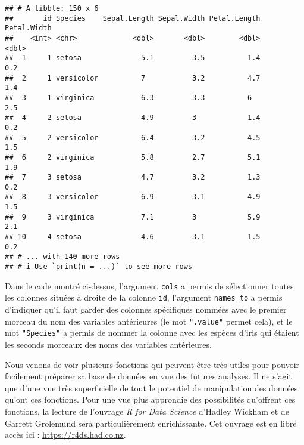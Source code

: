 \documentclass[
  french,
]{book}
\newenvironment{Shaded}{\begin{snugshade}}{\end{snugshade}}
\newcommand{\DataTypeTok}[1]{\textcolor[rgb]{0.13,0.29,0.53}{#1}}
\newcommand{\KeywordTok}[1]{\textcolor[rgb]{0.13,0.29,0.53}{\textbf{#1}}}
\newcommand{\NormalTok}[1]{#1}
\newcommand{\OperatorTok}[1]{\textcolor[rgb]{0.81,0.36,0.00}{\textbf{#1}}}
\newcommand{\StringTok}[1]{\textcolor[rgb]{0.31,0.60,0.02}{#1}}
\begin{document}
\begin{Shaded}
\end{Shaded}

\begin{verbatim}
## # A tibble: 150 x 6
##       id Species    Sepal.Length Sepal.Width Petal.Length Petal.Width
##    <int> <chr>             <dbl>       <dbl>        <dbl>       <dbl>
##  1     1 setosa              5.1         3.5          1.4         0.2
##  2     1 versicolor          7           3.2          4.7         1.4
##  3     1 virginica           6.3         3.3          6           2.5
##  4     2 setosa              4.9         3            1.4         0.2
##  5     2 versicolor          6.4         3.2          4.5         1.5
##  6     2 virginica           5.8         2.7          5.1         1.9
##  7     3 setosa              4.7         3.2          1.3         0.2
##  8     3 versicolor          6.9         3.1          4.9         1.5
##  9     3 virginica           7.1         3            5.9         2.1
## 10     4 setosa              4.6         3.1          1.5         0.2
## # ... with 140 more rows
## # i Use `print(n = ...)` to see more rows
\end{verbatim}

Dans le code montré ci-dessus, l'argument \texttt{cols} a permis de sélectionner toutes les colonnes situées à droite de la colonne \texttt{id}, l'argument \texttt{names\_to} a permis d'indiquer qu'il faut garder des colonnes spécifiques nommées avec le premier morceau du nom des variables antérieures (le mot \texttt{".value"} permet cela), et le mot \texttt{"Species"} a permis de nommer la colonne avec les espèces d'iris qui étaient les seconds morceaux des noms des variables antérieures.

Nous venons de voir plusieurs fonctions qui peuvent être très utiles pour pouvoir facilement préparer sa base de données en vue des futures analyses. Il ne s'agit que d'une vue très superficielle de tout le potentiel de manipulation des données qu'ont ces fonctions. Pour une vue plus approndie des possibilités qu'offrent ces fonctions, la lecture de l'ouvrage \emph{R for Data Science} d'Hadley Wickham et de Garrett Grolemund \autocite*{wickhamDataScience2017} sera particulièrement enrichissante. Cet ouvrage est en libre accès ici : \url{https://r4ds.had.co.nz}.
\end{document}
